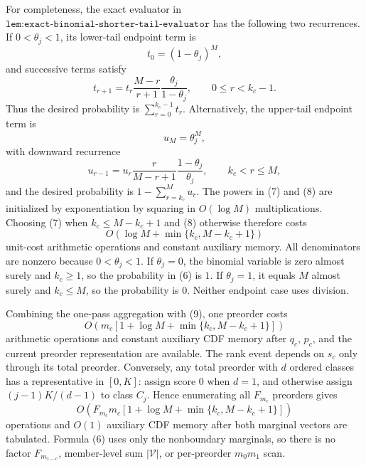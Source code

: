 For completeness, the exact evaluator in \(\texttt{lem:exact-binomial-shorter-tail-evaluator}\) has the following two recurrences. If \(0<\theta_j<1\), its lower-tail endpoint term is
\[
t_0=(1-\theta_j)^M,
\]
and successive terms satisfy
\[
t_{r+1}=t_r\frac{M-r}{r+1}\frac{\theta_j}{1-\theta_j},
\qquad 0\le r<k_c-1.
\tag{7}
\]
Thus the desired probability is \(\sum_{r=0}^{k_c-1}t_r\). Alternatively, the upper-tail endpoint term is
\[
u_M=\theta_j^M,
\]
with downward recurrence
\[
u_{r-1}=u_r\frac{r}{M-r+1}\frac{1-\theta_j}{\theta_j},
\qquad k_c<r\le M,
\tag{8}
\]
and the desired probability is \(1-\sum_{r=k_c}^M u_r\). The powers in (7) and (8) are initialized by exponentiation by squaring in \(O(\log M)\) multiplications. Choosing (7) when \(k_c\le M-k_c+1\) and (8) otherwise therefore costs
\[
O\!\left(\log M+\min\{k_c,M-k_c+1\}\right)
\tag{9}
\]
unit-cost arithmetic operations and constant auxiliary memory. All denominators are nonzero because \(0<\theta_j<1\). If \(\theta_j=0\), the binomial variable is zero almost surely and \(k_c\ge1\), so the probability in (6) is \(1\). If \(\theta_j=1\), it equals \(M\) almost surely and \(k_c\le M\), so the probability is \(0\). Neither endpoint case uses division.

Combining the one-pass aggregation with (9), one preorder costs
\[
O\!\left(m_c\left[1+\log M+\min\{k_c,M-k_c+1\}\right]\right)
\tag{10}
\]
arithmetic operations and constant auxiliary CDF memory after \(q_c\), \(p_c\), and the current preorder representation are available. The rank event depends on \(s_c\) only through its total preorder. Conversely, any total preorder with \(d\) ordered classes has a representative in \([0,K]\): assign score \(0\) when \(d=1\), and otherwise assign \((j-1)K/(d-1)\) to class \(C_j\). Hence enumerating all \(F_{m_c}\) preorders gives
\[
O\!\left(F_{m_c}m_c\left[1+\log M+\min\{k_c,M-k_c+1\}\right]\right)
\tag{11}
\]
operations and \(O(1)\) auxiliary CDF memory after both marginal vectors are tabulated. Formula (6) uses only the nonboundary marginals, so there is no factor \(F_{m_{1-c}}\), member-level sum \(|\mathcal V|\), or per-preorder \(m_0m_1\) scan.